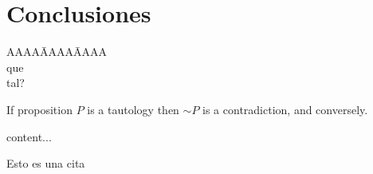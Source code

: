 \chapter{Conclusiones}
\label{cha:conclusiones}
\begin{tabbing}
AAAA\=AAAA\=AAAA\kill\\
\>que\\
\>\>tal?\\
\end{tabbing}
\begin{theorem}
If proposition $P$ is a tautology then $\sim P$ is a contradiction, and conversely.
\end{theorem}
\begin{theorem}
content...
\end{theorem}

Esto es una cita \cite{talbot97}


